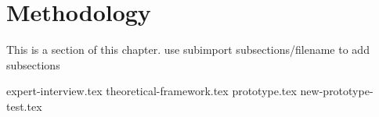 
\section{Methodology}
This is a section of this chapter.
use subimport {subsections/}{filename} to add subsections

{expert-interview.tex}
{theoretical-framework.tex}
{prototype.tex}
{new-prototype-test.tex}
